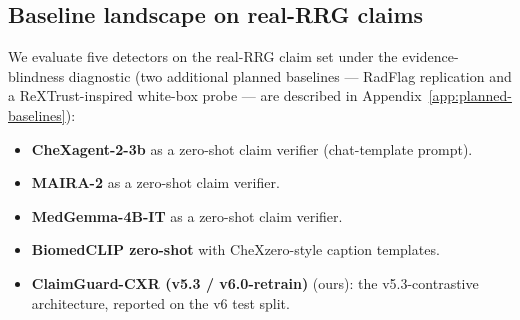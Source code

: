 \documentclass[pmlr]{jmlr}
\begin{document}
\subsection{Baseline landscape on real-RRG claims}
\label{sec:baselines}

We evaluate five detectors on the real-RRG claim set under the evidence-blindness diagnostic (two additional planned baselines — RadFlag replication and a ReXTrust-inspired white-box probe — are described in Appendix~\ref{app:planned-baselines}):

\begin{itemize}
\item \textbf{CheXagent-2-3b} \citep{chen2024chexagent} as a zero-shot claim verifier (chat-template prompt).
\item \textbf{MAIRA-2} \citep{bannur2024maira2} as a zero-shot claim verifier.
\item \textbf{MedGemma-4B-IT} \citep{google2025medgemma} as a zero-shot claim verifier.
\item \textbf{BiomedCLIP zero-shot} \citep{zhang2023biomedclip} with CheXzero-style caption templates.
\item \textbf{ClaimGuard-CXR (v5.3 / v6.0-retrain)} (ours): the v5.3-contrastive architecture, reported on the v6 test split.
\end{itemize}
\end{document}
